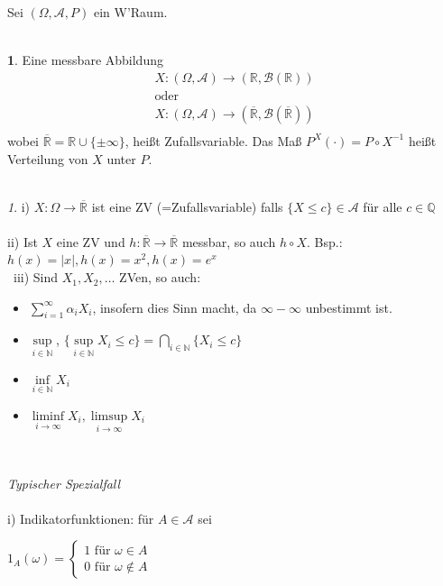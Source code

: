 \documentclass[10pt,a4paper]{report}
\numberwithin{equation}{section}
\numberwithin{figure}{section}
\theoremstyle{plain}
\theoremstyle{definition}
\newtheorem{defn}{\protect\definitionname}[section]
\theoremstyle{plain}
\theoremstyle{definition}
\theoremstyle{remark}
\newtheorem{rem}{\protect\remarkname}[section]
\theoremstyle{plain}
\theoremstyle{plain}
\theoremstyle{plain}
\theoremstyle{plain}
\theoremstyle{plain}
\providecommand{\definitionname}{Definition}
\providecommand{\remarkname}{Bemerkung}
\newcommand{\1}{ \mathbb{1} } %
\begin{document}
Sei $(\Omega,\mathcal{A},P)$ ein W'Raum.\\\\
\begin{defn}
  Eine messbare Abbildung
  \begin{eqnarray*}
    X:(\Omega,\mathcal{A}) \to (\mathbb{R},\mathcal{B}(\mathbb{R}))\\
    \text{oder}\\
    X:(\Omega,\mathcal{A}) \to (\overline{\mathbb{R}},\mathcal{B}(\overline{\mathbb{R}}))\\
  \end{eqnarray*}
  wobei $\overline{\mathbb{R}}=\mathbb{R}\cup\{\pm \infty \}$, heißt Zufallsvariable. Das Maß $P^X(\cdot)=P\circ X^{-1}$ heißt Verteilung von $X$ unter $P$.\\\\
\end{defn}
\begin{rem}
  i) $X: \Omega \to \overline{\mathbb{R}}$ ist eine ZV (=Zufallsvariable) falls $\{X\leq c\} \in \mathcal{A}$ für alle $c \in \mathbb{Q}$\\\\
  ii) Ist $X$ eine ZV und $h:\overline{\mathbb{R}} \to \overline{\mathbb{R}}$ messbar, so auch $h\circ X$. Bsp.:$h(x)=|x|, h(x)=x^2, h(x)=e^x$\\\
  iii) Sind $X_1,X_2,\dots$ ZVen, so auch:
  \begin{itemize}
  \item $\sum\limits_{i=1}^\infty \alpha_i X_i$, insofern dies Sinn
    macht, da $\infty-\infty$ unbestimmt ist.
  \item $\sup\limits_{i\in \mathbb{N}}$, $\{\sup\limits_{i \in
      \mathbb{N}} X_i \leq c\}=\bigcap\limits_{i \in \mathbb{N}}\{X_i
    \leq c\}$
  \item $\inf\limits_{i \in \mathbb{N}} X_i$
  \item $\liminf\limits_{i \to \infty} X_i, \limsup\limits_{i \to
      \infty} X_i$
  \end{itemize}
  $ $
\end{rem}
\textit{Typischer Spezialfall}\\\\
i) Indikatorfunktionen: für $A \in \mathcal{A}$ sei
\begin{center}
$1_A(\omega)=
\begin{cases}
1 \text{ für } \omega \in A\\
0 \text{ für } \omega \notin A
\end{cases}$
\end{center}
\end{document}
